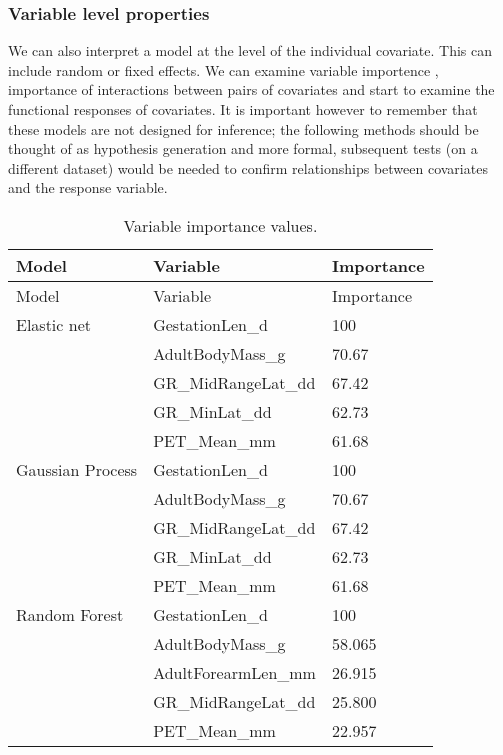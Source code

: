 \documentclass[10pt,]{article}
\begin{document}
\subsubsection{Variable level properties}\label{variable-level-properties}

We can also interpret a model at the level of the individual covariate. This can include random or fixed effects. We can examine variable importence \citep{oppel2009alternative}, importance of interactions between pairs of covariates and start to examine the functional responses of covariates. It is important however to remember that these models are not designed for inference; the following methods should be thought of as hypothesis generation and more formal, subsequent tests (on a different dataset) would be needed to confirm relationships between covariates and the response variable.

\begin{table}[t!]
\begin{longtable}[c]{@{}lll@{}}
\caption{Variable importance values. \label{tbl:varimp}}\tabularnewline
\toprule
Model & Variable & Importance\tabularnewline
\midrule
\endfirsthead
\toprule
Model & Variable & Importance\tabularnewline
\midrule
\endhead
Elastic net & GestationLen\_d & 100\tabularnewline
& AdultBodyMass\_g & 70.67\tabularnewline
& GR\_MidRangeLat\_dd & 67.42\tabularnewline
& GR\_MinLat\_dd & 62.73\tabularnewline
& PET\_Mean\_mm & 61.68\tabularnewline
Gaussian Process & GestationLen\_d & 100\tabularnewline
& AdultBodyMass\_g & 70.67\tabularnewline
& GR\_MidRangeLat\_dd & 67.42\tabularnewline
& GR\_MinLat\_dd & 62.73\tabularnewline
& PET\_Mean\_mm & 61.68\tabularnewline
Random Forest & GestationLen\_d & 100\tabularnewline
& AdultBodyMass\_g & 58.065\tabularnewline
& AdultForearmLen\_mm & 26.915\tabularnewline
& GR\_MidRangeLat\_dd & 25.800\tabularnewline
& PET\_Mean\_mm & 22.957\tabularnewline
\bottomrule
\end{longtable}
\end{table}
\end{document}
